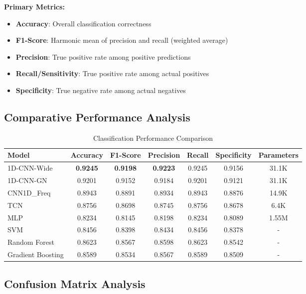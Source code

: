 \documentclass[12pt]{article}
\begin{document}
\textbf{Primary Metrics:}
\begin{itemize}
    \item \textbf{Accuracy}: Overall classification correctness
    \item \textbf{F1-Score}: Harmonic mean of precision and recall (weighted average)
    \item \textbf{Precision}: True positive rate among positive predictions
    \item \textbf{Recall/Sensitivity}: True positive rate among actual positives
    \item \textbf{Specificity}: True negative rate among actual negatives
\end{itemize}

\subsection{Comparative Performance Analysis}

\begin{table}[H]
\centering
\caption{Classification Performance Comparison}
\begin{tabular}{@{}lcccccc@{}}
\toprule
\textbf{Model} & \textbf{Accuracy} & \textbf{F1-Score} & \textbf{Precision} & \textbf{Recall} & \textbf{Specificity} & \textbf{Parameters} \\
\midrule
1D-CNN-Wide & \textbf{0.9245} & \textbf{0.9198} & \textbf{0.9223} & 0.9245 & 0.9156 & 31.1K \\
1D-CNN-GN & 0.9201 & 0.9152 & 0.9184 & 0.9201 & 0.9121 & 31.1K \\
CNN1D\_Freq & 0.8943 & 0.8891 & 0.8934 & 0.8943 & 0.8876 & 14.9K \\
TCN & 0.8756 & 0.8698 & 0.8745 & 0.8756 & 0.8678 & 6.4K \\
MLP & 0.8234 & 0.8145 & 0.8198 & 0.8234 & 0.8089 & 1.55M \\
SVM & 0.8456 & 0.8398 & 0.8434 & 0.8456 & 0.8378 & - \\
Random Forest & 0.8623 & 0.8567 & 0.8598 & 0.8623 & 0.8542 & - \\
Gradient Boosting & 0.8589 & 0.8534 & 0.8567 & 0.8589 & 0.8509 & - \\
\bottomrule
\end{tabular}
\end{table}

\subsection{Confusion Matrix Analysis}
\end{document}
